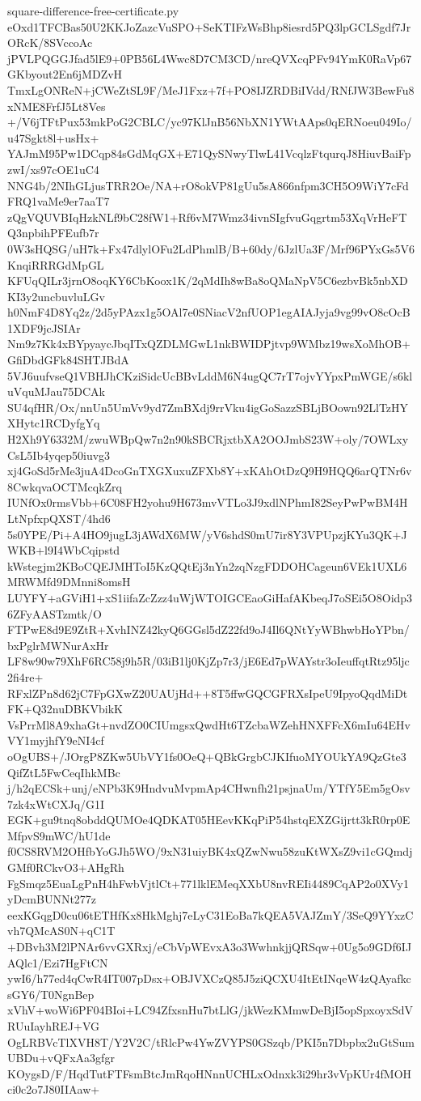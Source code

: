 \documentclass[11pt]{article}
\theoremstyle{definition}
\theoremstyle{remark}
\begin{document}
\begin{filecontents*}[overwrite]{square-difference-free-certificate.py}
eOxd1TFCBas50U2KKJoZazcVuSPO+SeKTIFzWsBhp8iesrd5PQ3lpGCLSgdf7JrORcK/8SVccoAc
jPVLPQGGJfad5lE9+0PB56L4Wwc8D7CM3CD/nreQVXcqPFv94YmK0RaVp67GKbyout2En6jMDZvH
TmxLgONReN+jCWeZtSL9F/MeJ1Fxz+7f+PO8IJZRDBiIVdd/RNfJW3BewFu8xNME8FrfJ5Lt8Ves
+/V6jTFtPux53mkPoG2CBLC/yc97KlJnB56NbXN1YWtAAps0qERNoeu049Io/u47Sgkt8l+usHx+
YAJmM95Pw1DCqp84sGdMqGX+E71QySNwyTlwL41VcqlzFtqurqJ8HiuvBaiFpzwI/xs97cOE1uC4
NNG4b/2NIhGLjusTRR2Oe/NA+rO8okVP81gUu5sA866nfpm3CH5O9WiY7cFdFRQ1vaMe9er7aaT7
zQgVQUVBIqHzkNLf9bC28fW1+Rf6vM7Wmz34ivnSIgfvuGqgrtm53XqVrHeFTQ3npbihPFEufb7r
0W3sHQSG/uH7k+Fx47dlylOFu2LdPhmlB/B+60dy/6JzlUa3F/Mrf96PYxGs5V6KnqiRRRGdMpGL
KFUqQILr3jrnO8oqKY6CbKoox1K/2qMdIh8wBa8oQMaNpV5C6ezbvBk5nbXDKI3y2uncbuvluLGv
h0NmF4D8Yq2z/2d5yPAzx1g5OAl7e0SNiacV2nfUOP1egAIAJyja9vg99vO8cOcB1XDF9jcJSIAr
Nm9z7Kk4xBYpyaycJbqITxQZDLMGwL1nkBWIDPjtvp9WMbz19wsXoMhOB+GfiDbdGFk84SHTJBdA
5VJ6uufvseQ1VBHJhCKziSidcUcBBvLddM6N4ugQC7rT7ojvYYpxPmWGE/s6kluVquMJau75DCAk
SU4qfHR/Ox/nnUn5UmVv9yd7ZmBXdj9rrVku4igGoSazzSBLjBOown92LlTzHYXHytc1RCDyfgYq
H2Xh9Y6332M/zwuWBpQw7n2n90kSBCRjxtbXA2OOJmbS23W+oly/7OWLxyCsL5Ib4yqep50iuvg3
xj4GoSd5rMe3juA4DcoGnTXGXuxuZFXb8Y+xKAhOtDzQ9H9HQQ6arQTNr6v8CwkqvaOCTMcqkZrq
IUNfOx0rmsVbb+6C08FH2yohu9H673mvVTLo3J9xdlNPhmI82SeyPwPwBM4HLtNpfxpQXST/4hd6
5s0YPE/Pi+A4HO9jugL3jAWdX6MW/yV6shdS0mU7ir8Y3VPUpzjKYu3QK+JWKB+l9I4WbCqipstd
kWstegjm2KBoCQEJMHToI5KzQQtEj3nYn2zqNzgFDDOHCageun6VEk1UXL6MRWMfd9DMnni8omsH
LUYFY+aGViH1+xS1iifaZcZzz4uWjWTOIGCEaoGiHafAKbeqJ7oSEi5O8Oidp36ZFyAASTzmtk/O
FTPwE8d9E9ZtR+XvhINZ42kyQ6GGsl5dZ22fd9oJ4Il6QNtYyWBhwbHoYPbn/bxPglrMWNurAxHr
LF8w90w79XhF6RC58j9h5R/03iB1lj0KjZp7r3/jE6Ed7pWAYstr3oIeuffqtRtz95ljc2fi4re+
RFxlZPn8d62jC7FpGXwZ20UAUjHd++8T5ffwGQCGFRXsIpeU9IpyoQqdMiDtFK+Q32nuDBKVbikK
VsPrrMl8A9xhaGt+nvdZO0CIUmgsxQwdHt6TZcbaWZehHNXFFcX6mIu64EHvVY1myjhfY9eNI4cf
oOgUBS+/JOrgP8ZKw5UbVY1fs0OeQ+QBkGrgbCJKIfuoMYOUkYA9QzGte3QifZtL5FwCeqIhkMBc
j/h2qECSk+unj/eNPb3K9HndvuMvpmAp4CHwnfh21psjnaUm/YTfY5Em5gOsv7zk4xWtCXJq/G1I
EGK+gu9tnq8obddQUMOe4QDKAT05HEevKKqPiP54hstqEXZGijrtt3kR0rp0EMfpvS9mWC/hU1de
f0CS8RVM2OHfbYoGJh5WO/9xN31uiyBK4xQZwNwu58zuKtWXsZ9vi1cGQmdjGMf0RCkvO3+AHgRh
FgSmqz5EuaLgPnH4hFwbVjtlCt+771lklEMeqXXbU8nvREIi4489CqAP2o0XVy1yDcmBUNNt277z
eexKGqgD0cu06tETHfKx8HkMghj7eLyC31EoBa7kQEA5VAJZmY/3SeQ9YYxzCvh7QMcAS0N+qC1T
+DBvh3M2lPNAr6vvGXRxj/eCbVpWEvxA3o3WwhnkjjQRSqw+0Ug5o9GDf6IJAQlc1/Ezi7HgFtCN
ywI6/h77ed4qCwR4IT007pDsx+OBJVXCzQ85J5ziQCXU4ItEtINqeW4zQAyafkcsGY6/T0NgnBep
xVhV+woWi6PF04BIoi+LC94ZfxsnHu7btLlG/jkWezKMmwDeBjI5opSpxoyxSdVRUuIayhREJ+VG
OgLRBVcTlXVH8T/Y2V2C/tRlcPw4YwZVYPS0GSzqb/PKI5n7Dbpbx2uGtSumUBDu+vQFxAa3gfgr
KOygsD/F/HqdTutFTFsmBtcJmRqoHNnnUCHLxOdnxk3i29hr3vVpKUr4fMOHci0c2o7J80IIAaw+

\end{filecontents*}
\end{document}

